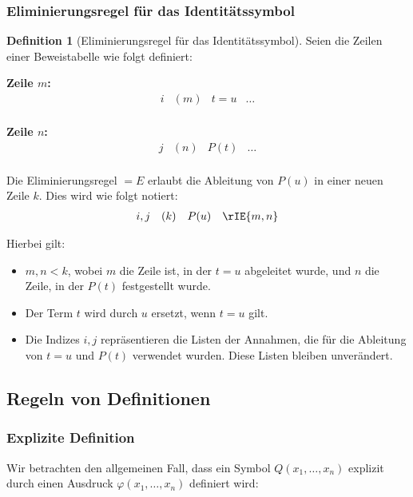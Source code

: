 \documentclass{book}
\theoremstyle{plain}
\theoremstyle{remark}
\theoremstyle{definition}
\newtheorem{definition}{Definition}[section]
\begin{document}
\subsubsection{Eliminierungsregel für das Identitätssymbol}
\label{rule:IE}
\begin{definition}[Eliminierungsregel für das Identitätssymbol]
Seien die Zeilen einer Beweistabelle wie folgt definiert:

\textbf{Zeile \(m\):}
\[
\begin{array}{llll}
    i & (m) & t = u & \dots \\
\end{array}
\]

\textbf{Zeile \(n\):}
\[
\begin{array}{llll}
    j & (n) & P(t) & \dots \\
\end{array}
\]

Die Eliminierungsregel \(=E\) erlaubt die Ableitung von \(P(u)\) in einer neuen Zeile \(k\). Dies wird wie folgt notiert:
\[
\begin{array}{llll}
    i,j & (k) & P(u) & \rIE{m,n} \\
\end{array}
\]

Hierbei gilt:
\begin{itemize}
    \item \(m, n < k\), wobei \(m\) die Zeile ist, in der \(t = u\) abgeleitet wurde, und \(n\) die Zeile, in der \(P(t)\) festgestellt wurde.
    \item Der Term \(t\) wird durch \(u\) ersetzt, wenn \(t = u\) gilt.
    \item Die Indizes \(i,j\) repräsentieren die Listen der Annahmen, die für die Ableitung von \(t = u\) und \(P(t)\) verwendet wurden. Diese Listen bleiben unverändert.
\end{itemize}
\end{definition}

\subsection{Regeln von Definitionen}

\subsubsection{Explizite Definition}
Wir betrachten den allgemeinen Fall, dass ein Symbol \(Q(x_1,\dots,x_n)\) explizit durch einen Ausdruck \(\varphi(x_1,\dots,x_n)\) definiert wird:
\end{document}
